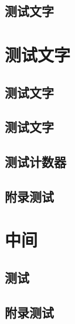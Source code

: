 \section{测试文字}


\chapter{测试文字}

\section{测试文字}

\section{测试文字}



\begin{Appendix}
	
\chapter{测试计数器}
	
\section{附录测试}
	
\end{Appendix}

\chapter{中间}

\begin{Appendix}

\chapter{测试}
	
\section{附录测试}
	
\end{Appendix}






